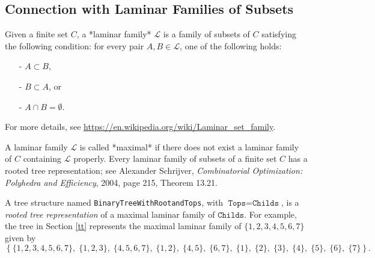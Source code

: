 \documentclass[11pt]{amsart}
\theoremstyle{remark}            %
\begin{document}
\subsection{Connection with Laminar Families of Subsets}

Given a finite set $C$, a *laminar family* $\mathcal{L}$ is a family of subsets of $C$ satisfying the following condition: for every pair $A,B \in \mathcal{L}$, one of the following holds:
\begin{itemize}
  \item[-] $A \subset B$,
  \item[-] $B \subset A$, or
  \item[-] $A \cap B = \emptyset$.
\end{itemize}
For more details, see \url{https://en.wikipedia.org/wiki/Laminar_set_family}.

A laminar family $\mathcal{L}$ is called *maximal* if there does not exist a  laminar family of $C$ containing $\mathcal{L}$ properly. Every laminar family of subsets of a finite set $C$ has a rooted tree representation; see Alexander Schrijver, {\it Combinatorial Optimization: Polyhedra and Efficiency}, 2004, page 215, Theorem 13.21.

A tree structure named \texttt{BinaryTreeWithRootandTops}, with $\texttt{Tops} = \texttt{Childs}$, is a {\it rooted tree representation} of a maximal laminar family of $\texttt{Childs}$. For example, the tree in Section \ref{tt} represents the maximal laminar family of $\{1,2,3,4,5,6,7\}$ given by
$$
\left\{
  \{1,2,3,4,5,6,7\},\;
  \{1,2,3\},\;
  \{4,5,6,7\},\;
  \{1,2\},\;
  \{4,5\},\;
  \{6,7\},\;
  \{1\},\;
  \{2\},\;
  \{3\},\;
  \{4\},\;
  \{5\},\;
  \{6\},\;
  \{7\}
\right\}.
$$




 
\end{document}
